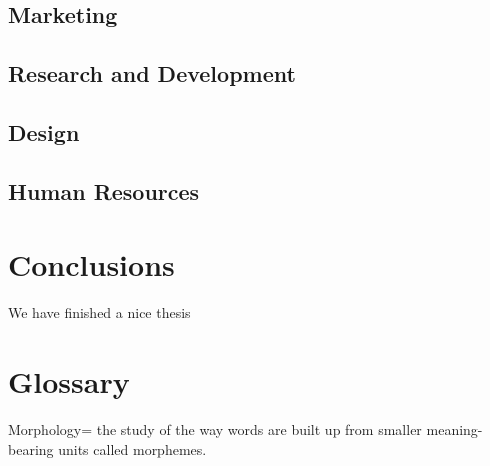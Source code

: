 \documentclass[]{book}
\begin{document}
\section{Marketing}\label{marketing}

\section{Research and Development}\label{research-and-development}

\section{Design}\label{design}

\section{Human Resources}\label{human-resources}

\chapter{Conclusions}\label{conclusions}

We have finished a nice thesis

\chapter{Glossary}\label{glossary}

Morphology= the study of the way words are built up from smaller
meaning-bearing units called morphemes.


\end{document}
